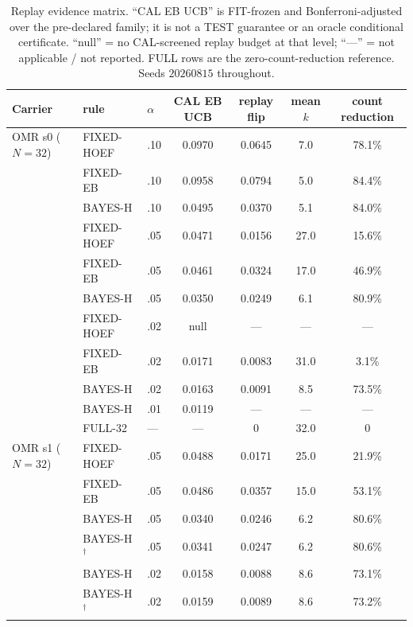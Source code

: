 \documentclass{article}
\theoremstyle{definition}
\theoremstyle{remark}
\begin{document}
\begin{table}[h]
\centering\small\setlength{\tabcolsep}{3pt}
\caption{Replay evidence matrix. ``CAL EB UCB'' is FIT-frozen and
Bonferroni-adjusted over the pre-declared family; it is not a TEST guarantee or
an oracle conditional certificate. ``null'' = no CAL-screened replay budget at
that level; ``---'' = not applicable / not reported. FULL rows are the
zero-count-reduction reference. Seeds $20260815$ throughout.}
\label{tab:matrix}
\begin{tabular}{lllcccc}
\toprule
Carrier & rule & $\alpha$ & CAL EB UCB & replay flip & mean $k$ & count reduction \\
\midrule
OMR s0 ($N{=}32$)   & FIXED-HOEF & .10 & 0.0970 & 0.0645 & 7.0 & 78.1\% \\
                    & FIXED-EB   & .10 & 0.0958 & 0.0794 & 5.0 & 84.4\% \\
                    & BAYES-H    & .10 & 0.0495 & 0.0370 & 5.1 & 84.0\% \\
                    & FIXED-HOEF & .05 & 0.0471 & 0.0156 & 27.0 & 15.6\% \\
                    & FIXED-EB   & .05 & 0.0461 & 0.0324 & 17.0 & 46.9\% \\
                    & BAYES-H    & .05 & 0.0350 & 0.0249 & 6.1 & 80.9\% \\
                    & FIXED-HOEF & .02 & null & --- & --- & --- \\
                    & FIXED-EB   & .02 & 0.0171 & 0.0083 & 31.0 & 3.1\% \\
                    & BAYES-H    & .02 & 0.0163 & 0.0091 & 8.5 & 73.5\% \\
                    & BAYES-H    & .01 & 0.0119 & --- & --- & --- \\
                    & FULL-32    & --- & --- & 0 & 32.0 & 0 \\
\midrule
OMR s1 ($N{=}32$)   & FIXED-HOEF & .05 & 0.0488 & 0.0171 & 25.0 & 21.9\% \\
                    & FIXED-EB   & .05 & 0.0486 & 0.0357 & 15.0 & 53.1\% \\
                    & BAYES-H    & .05 & 0.0340 & 0.0246 & 6.2 & 80.6\% \\
                    & BAYES-H$^\dagger$ & .05 & 0.0341 & 0.0247 & 6.2 & 80.6\% \\
                    & BAYES-H    & .02 & 0.0158 & 0.0088 & 8.6 & 73.1\% \\
                    & BAYES-H$^\dagger$ & .02 & 0.0159 & 0.0089 & 8.6 & 73.2\% \\

\end{tabular}
\end{table}
\end{document}
